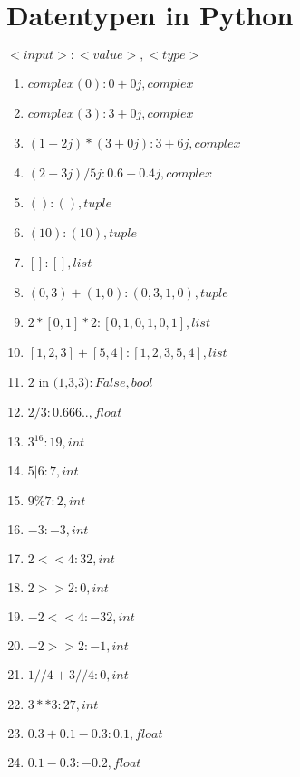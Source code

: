 
\newcommand{\dozent}{Prof. Dr. Claudia Müller-Birn, Barry Linnert}					%
\newcommand{\tutor}{Thierry Meurers}						%
\newcommand{\tutoriumNo}{10}				%
\newcommand{\ubungNo}{02}									%
\newcommand{\veranstaltung}{Objektorientierte Programmierung}	%
\newcommand{\semester}{SoSe 17}						%
\newcommand{\studenten}{Stefaan Hessmann, Jaap Pedersen, Mark Niehues}			%




\section{Datentypen in Python}
$<input>: <value>, <type>$
\begin{enumerate}
\item $complex(0): 0+0j, complex$
\item $complex(3): 3+0j, complex$
\item $(1+2j)*(3+0j): 3+6j, complex$
\item $(2+3j)/5j: 0.6-0.4j, complex$
\item $(): (), tuple$
\item $(10): (10), tuple$
\item $[]: [], list$
\item $(0,3)+(1,0): (0,3,1,0), tuple$
\item $2*[0,1]*2: [0,1,0,1,0,1], list$
\item $[1,2,3]+[5,4]: [1,2,3,5,4], list$
\item $\text{2 in (1,3,3)}: False, bool$
\item $2/3: 0.666.., float$
\item $3^16: 19, int$
\item $5|6: 7, int$
\item $9\%7: 2, int$
\item $-3: -3, int$
\item $2<<4: 32, int$
\item $2>>2: 0, int$
\item $-2<<4: -32, int$
\item $-2>>2: -1, int$
\item $1//4+3//4: 0, int$
\item $3**3: 27, int$
\item $0.3+0.1-0.3: 0.1, float$
\item $0.1-0.3: -0.2, float$
\end{enumerate}

